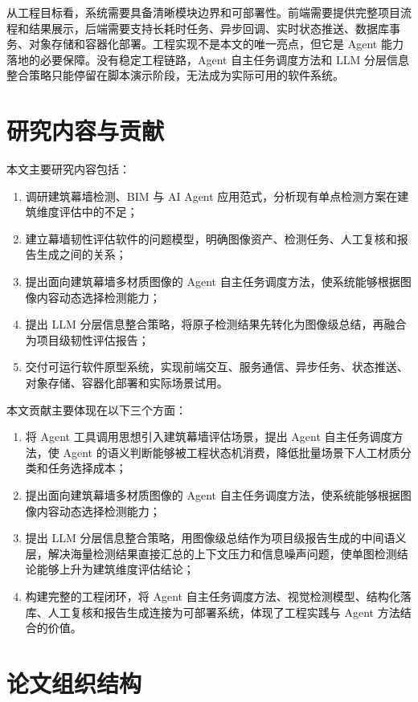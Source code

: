 从工程目标看，系统需要具备清晰模块边界和可部署性。前端需要提供完整项目流程和结果展示，后端需要支持长耗时任务、异步回调、实时状态推送、数据库事务、对象存储和容器化部署。工程实现不是本文的唯一亮点，但它是 Agent 能力落地的必要保障。没有稳定工程链路，Agent 自主任务调度方法和 LLM 分层信息整合策略只能停留在脚本演示阶段，无法成为实际可用的软件系统。

\section{研究内容与贡献}
\label{sec:introduction-research-content-and-contribution}

本文主要研究内容包括：

\begin{enumerate}
  \item 调研建筑幕墙检测、BIM 与 AI Agent 应用范式，分析现有单点检测方案在建筑维度评估中的不足；
  \item 建立幕墙韧性评估软件的问题模型，明确图像资产、检测任务、人工复核和报告生成之间的关系；
  \item 提出面向建筑幕墙多材质图像的 Agent 自主任务调度方法，使系统能够根据图像内容动态选择检测能力；
  \item 提出 LLM 分层信息整合策略，将原子检测结果先转化为图像级总结，再融合为项目级韧性评估报告；
  \item 交付可运行软件原型系统，实现前端交互、服务通信、异步任务、状态推送、对象存储、容器化部署和实际场景试用。
\end{enumerate}

本文贡献主要体现在以下三个方面：

\begin{enumerate}
  \item 将 Agent 工具调用思想引入建筑幕墙评估场景，提出 Agent 自主任务调度方法，使 Agent 的语义判断能够被工程状态机消费，降低批量场景下人工材质分类和任务选择成本；
  \item 提出面向建筑幕墙多材质图像的 Agent 自主任务调度方法，使系统能够根据图像内容动态选择检测能力；
  \item 提出 LLM 分层信息整合策略，用图像级总结作为项目级报告生成的中间语义层，解决海量检测结果直接汇总的上下文压力和信息噪声问题，使单图检测结论能够上升为建筑维度评估结论；
  \item 构建完整的工程闭环，将 Agent 自主任务调度方法、视觉检测模型、结构化落库、人工复核和报告生成连接为可部署系统，体现了工程实践与 Agent 方法结合的价值。
\end{enumerate}

\section{论文组织结构}
\label{sec:introduction-thesis-organization}

